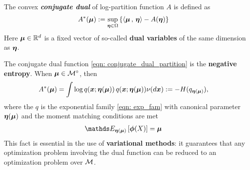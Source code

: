\documentclass[11pt]{article}
\begin{document}
The convex \textbf{\emph{conjugate dual}} of log-partition function $A$ is defined as 
\begin{align}
A^{*}(\boldsymbol{\mu}) &:= \sup_{\boldsymbol{\eta} \in \Omega} \left\{\left\langle \boldsymbol{\mu}\,,\, \boldsymbol{\eta} \right\rangle - A(\boldsymbol{\eta})\right\} \label{eqn: conjugate_dual_partition}
\end{align} Here $\boldsymbol{\mu} \in {\mathbb R}^{d}$ is a fixed vector of so-called \textbf{dual variables} of the same dimension as $\boldsymbol{\eta}$. 

The conjugate dual function \eqref{eqn: conjugate_dual_partition} is the \textbf{negative} \textbf{entropy}. When $\boldsymbol{\mu} \in {\mathcal M}^{\circ}$, then 
\begin{align*}
A^{*}(\boldsymbol{\mu})  &= \int \log q(\boldsymbol{x}; \boldsymbol{\eta}(\boldsymbol{\mu})) \, q(\boldsymbol{x}; \boldsymbol{\eta}(\boldsymbol{\mu})) \nu(d\boldsymbol{x})  := -H(q_{\boldsymbol{\eta}(\boldsymbol{\mu})}), 
\end{align*} where the $q$ is the exponential family \eqref{eqn: exp_fam} with canonical parameter $\boldsymbol{\eta}(\boldsymbol{\mu})$ and the moment matching conditions are met
\begin{align}
\E{\mb{\eta}(\mb{\mu})}{\mb{\phi}(X)} &= \mb{\mu} \label{eqn: dual_condition}
\end{align} This fact is essential in the use of \textbf{variational methods}: it guarantees that any optimization problem involving the dual function can be reduced to an optimization problem over ${\mathcal M}$.
\end{document}
